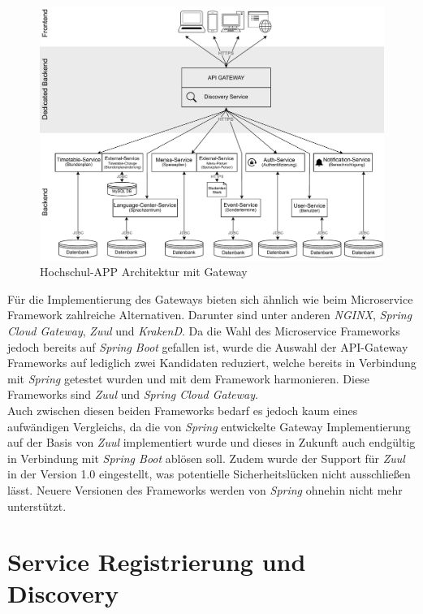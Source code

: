 \begin{figure}[H]
\centering
\includegraphics[width=\pictureWidth cm + 2cm]{Bilder/Kapitel_3/app_architektur_proxy.pdf}
\caption{Hochschul-APP Architektur mit Gateway\label{fig:architekturwithproxy}}
\end{figure}

Für die Implementierung des Gateways bieten sich ähnlich wie beim Microservice Framework zahlreiche Alternativen. Darunter sind unter anderen \textit{NGINX}, \textit{Spring Cloud Gateway}, \textit{Zuul} und \textit{KrakenD}. Da die Wahl des Microservice Frameworks jedoch bereits auf \textit{Spring Boot} gefallen ist, wurde die Auswahl der \ac{API}-Gateway Frameworks auf lediglich zwei Kandidaten reduziert, welche bereits in Verbindung mit \textit{Spring} getestet wurden und mit dem Framework harmonieren. Diese Frameworks sind \textit{Zuul} und \textit{Spring Cloud Gateway}.\\
\linebreak
Auch zwischen diesen beiden Frameworks bedarf es jedoch kaum eines aufwändigen Vergleichs, da die von \textit{Spring} entwickelte Gateway Implementierung auf der Basis von \textit{Zuul} implementiert wurde und dieses in Zukunft auch endgültig in Verbindung mit \textit{Spring Boot} ablösen soll. Zudem wurde der Support für \textit{Zuul} in der Version 1.0 eingestellt, was potentielle Sicherheitslücken nicht ausschließen lässt. Neuere Versionen des Frameworks werden von \textit{Spring} ohnehin nicht mehr unterstützt.

\section{Service Registrierung und Discovery}
\label{sec:registryanddiscovery}

